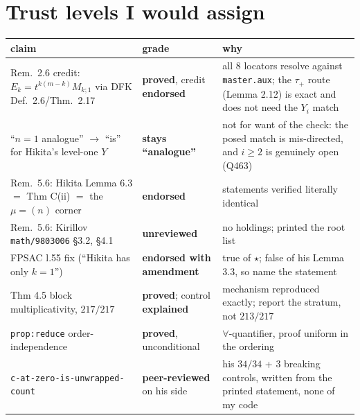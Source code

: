 \documentclass[11pt]{article}
\theoremstyle{remark}
\begin{document}
\section{Trust levels I would assign}
\begin{center}\small
\begin{tabular}{p{}p{}p{}}
\toprule
claim & grade & why \\
\midrule
Rem.~2.6 credit: $E_k=t^{k(m-k)}M_{k;1}$ via DFK Def.~2.6/Thm.~2.17 & \textbf{proved}, credit \textbf{endorsed} & all 8 locators resolve against \texttt{master.aux}; the $\tau_+$ route (Lemma 2.12) is exact and does not need the $Y_i$ match \\
``$n=1$ analogue'' $\to$ ``is'' for Hikita's level-one $Y$ & \textbf{stays ``analogue''} & not for want of the check: the posed match is mis-directed, and $i\ge2$ is genuinely open (Q463) \\
Rem.~5.6: Hikita Lemma 6.3 $=$ Thm C(ii) $=$ the $\mu=(n)$ corner & \textbf{endorsed} & statements verified literally identical \\
Rem.~5.6: Kirillov \texttt{math/9803006} \S3.2, \S4.1 & \textbf{unreviewed} & no holdings; printed the root list \\
FPSAC l.55 fix (``Hikita has only $k=1$'') & \textbf{endorsed with amendment} & true of $\star$; false of his Lemma 3.3, so name the statement \\
Thm 4.5 block multiplicativity, $217/217$ & \textbf{proved}; control \textbf{explained} & mechanism reproduced exactly; report the stratum, not $213/217$ \\
\texttt{prop:reduce} order-independence & \textbf{proved}, unconditional & $\forall$-quantifier, proof uniform in the ordering \\
\texttt{c-at-zero-is-unwrapped-count} & \textbf{peer-reviewed} on his side & his $34/34$ + 3 breaking controls, written from the printed statement, none of my code \\
\bottomrule
\end{tabular}
\end{center}
\end{document}
